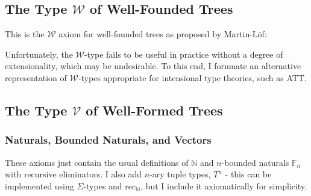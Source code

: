 \documentclass{article}
\newcommand{\set}{\mathcal{U}}
\newcommand{\W}{\mathcal{W}}
\newcommand{\V}{\mathcal{V}}
\newcommand{\nat}{\mathbb{N}}
\newcommand{\fin}{\mathbb{F}}
\newcommand{\rec}{\mathrm{rec}}
\newcommand{\fun}[2]{\lambda #1. #2}
\newcommand{\for}[2]{\Pi_{#1}#2}
\newcommand{\evals}{\rightsquigarrow^{nf}}
\begin{document}
\subsection{The Type $\W$ of Well-Founded Trees}

This is the $\W$ axiom for well-founded trees as proposed by Martin-L{\"o}f\cite{MLTT:1}:


Unfortunately, the $\W$-type fails to be useful in practice without a degree of extensionality\cite{OTT:1}, which may be undesirable. To this end, I formuate an alternative representation of $\W$-types appropriate for intensional type theories, such as ATT.

\subsection{The Type $\V$ of Well-Formed Trees}

\subsubsection{Naturals, Bounded Naturals, and Vectors}

These axioms just contain the usual definitions of $\nat$ and $n$-bounded naturals $\fin_n$ with recursive eliminators. I also add $n$-ary tuple types, $T^n$ - this can be implemented using $\Sigma$-types and $\rec_\nat$, but I include it axiomatically for simplicity.
\end{document}

